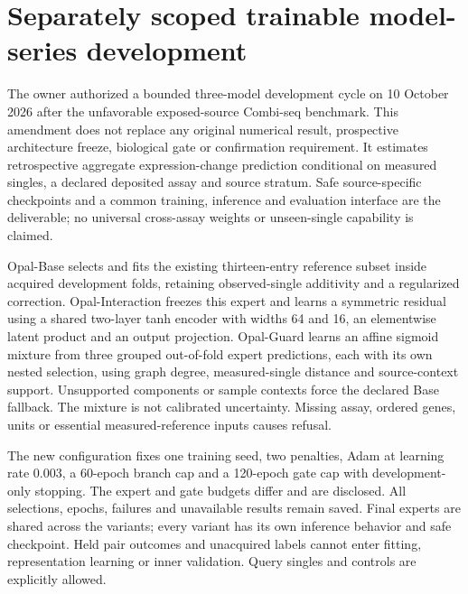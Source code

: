 \section{Separately scoped trainable model-series development}
The owner authorized a bounded three-model development cycle on 10 October 2026 after the unfavorable exposed-source Combi-seq benchmark. This amendment does not replace any original numerical result, prospective architecture freeze, biological gate or confirmation requirement. It estimates retrospective aggregate expression-change prediction conditional on measured singles, a declared deposited assay and source stratum. Safe source-specific checkpoints and a common training, inference and evaluation interface are the deliverable; no universal cross-assay weights or unseen-single capability is claimed.

Opal-Base selects and fits the existing thirteen-entry reference subset inside acquired development folds, retaining observed-single additivity and a regularized correction. Opal-Interaction freezes this expert and learns a symmetric residual using a shared two-layer tanh encoder with widths 64 and 16, an elementwise latent product and an output projection. Opal-Guard learns an affine sigmoid mixture from three grouped out-of-fold expert predictions, each with its own nested selection, using graph degree, measured-single distance and source-context support. Unsupported components or sample contexts force the declared Base fallback. The mixture is not calibrated uncertainty. Missing assay, ordered genes, units or essential measured-reference inputs causes refusal.

The new configuration fixes one training seed, two penalties, Adam at learning rate 0.003, a 60-epoch branch cap and a 120-epoch gate cap with development-only stopping. The expert and gate budgets differ and are disclosed. All selections, epochs, failures and unavailable results remain saved. Final experts are shared across the variants; every variant has its own inference behavior and safe checkpoint. Held pair outcomes and unacquired labels cannot enter fitting, representation learning or inner validation. Query singles and controls are explicitly allowed.

